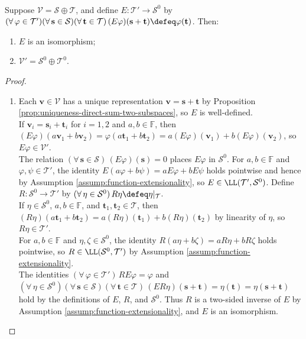 \begin{theorem} \label{thm:direct-sum-dual-annihilator} \\
Suppose $\mathcal{V}=\mathcal{S}\oplus\mathcal{T}$, and define $E:\mathcal{T}'\to\mathcal{S}^0$ by $(\forall\,\varphi\in\mathcal{T}')(\forall\,\mathbf{s}\in\mathcal{S})(\forall\,\mathbf{t}\in\mathcal{T})\,(E\varphi)(\mathbf{s}+\mathbf{t})\defeq\varphi(\mathbf{t})$. Then:
\begin{enumerate}[label=(\roman*)]
\setlength{\itemsep}{0pt}
\item $E$ is an isomorphism;
\item $\mathcal{V}'=\mathcal{S}^0\oplus\mathcal{T}^0$.
\end{enumerate}
\begin{proof}
\begin{enumerate}[label=(\roman*)]
\setlength{\itemsep}{0pt}
\item Each $\mathbf{v}\in\mathcal{V}$ has a unique representation $\mathbf{v}=\mathbf{s}+\mathbf{t}$ by Proposition \ref{prop:uniqueness-direct-sum-two-subspaces}, so $E$ is well-defined.\\
If $\mathbf{v}_i=\mathbf{s}_i+\mathbf{t}_i$ for $i=1,2$ and $a,b\in\mathbb{F}$, then $(E\varphi)(a\mathbf{v}_1+b\mathbf{v}_2)=\varphi(a\mathbf{t}_1+b\mathbf{t}_2)=a(E\varphi)(\mathbf{v}_1)+b(E\varphi)(\mathbf{v}_2)$, so $E\varphi\in\mathcal{V}'$.\\
The relation $(\forall\,\mathbf{s}\in\mathcal{S})\,(E\varphi)(\mathbf{s})=0$ places $E\varphi$ in $\mathcal{S}^0$. For $a,b\in\mathbb{F}$ and $\varphi,\psi\in\mathcal{T}'$, the identity $E(a\varphi+b\psi)=aE\varphi+bE\psi$ holds pointwise and hence by Assumption \ref{assump:function-extensionality}, so $E\in\LL(\mathcal{T}',\mathcal{S}^0)$. Define $R:\mathcal{S}^0\to\mathcal{T}'$ by $(\forall\,\eta\in\mathcal{S}^0)\,R\eta\defeq\eta|_{\mathcal{T}}$.\\
If $\eta\in\mathcal{S}^0$, $a,b\in\mathbb{F}$, and $\mathbf{t}_1,\mathbf{t}_2\in\mathcal{T}$, then $(R\eta)(a\mathbf{t}_1+b\mathbf{t}_2)=a(R\eta)(\mathbf{t}_1)+b(R\eta)(\mathbf{t}_2)$ by linearity of $\eta$, so $R\eta\in\mathcal{T}'$.\\
For $a,b\in\mathbb{F}$ and $\eta,\zeta\in\mathcal{S}^0$, the identity $R(a\eta+b\zeta)=aR\eta+bR\zeta$ holds pointwise, so $R\in\LL(\mathcal{S}^0,\mathcal{T}')$ by Assumption \ref{assump:function-extensionality}.\\
The identities $(\forall\,\varphi\in\mathcal{T}')\,RE\varphi=\varphi$ and $(\forall\,\eta\in\mathcal{S}^0)(\forall\,\mathbf{s}\in\mathcal{S})(\forall\,\mathbf{t}\in\mathcal{T})\,(ER\eta)(\mathbf{s}+\mathbf{t})=\eta(\mathbf{t})=\eta(\mathbf{s}+\mathbf{t})$ hold by the definitions of $E$, $R$, and $\mathcal{S}^0$. Thus $R$ is a two-sided inverse of $E$ by Assumption \ref{assump:function-extensionality}, and $E$ is an isomorphism.

\end{enumerate}
\end{proof}
\end{theorem}
